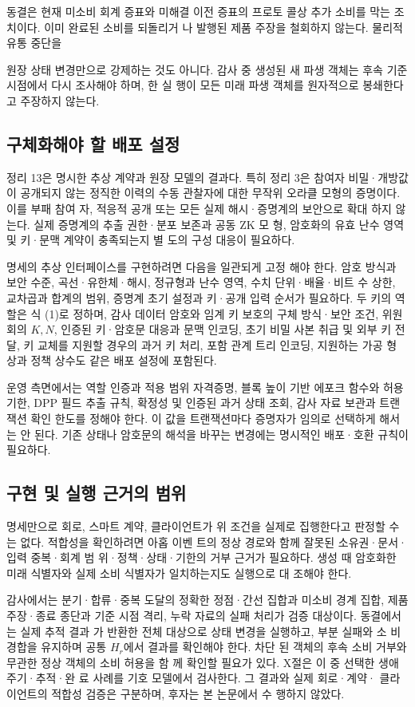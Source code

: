 동결은 현재 미소비 회계 증표와 미해결 이전 증표의 프로토
콜상 추가 소비를 막는 조치이다. 이미 완료된 소비를 되돌리거
나 발행된 제품 주장을 철회하지 않는다. 물리적 유통 중단을

원장 상태 변경만으로 강제하는 것도 아니다. 감사 중 생성된
새 파생 객체는 후속 기준 시점에서 다시 조사해야 하며, 한 실
행이 모든 미래 파생 객체를 원자적으로 봉쇄한다고 주장하지
않는다.

\subsection{구체화해야 할 배포 설정}
정리 13은 명시한 추상 계약과 원장 모델의 결과다. 특히 정리
3은 참여자 비밀·개방값이 공개되지 않는 정직한 이력의 수동
관찰자에 대한 무작위 오라클 모형의 증명이다. 이를 부패 참여
자, 적응적 공개 또는 모든 실제 해시·증명계의 보안으로 확대
하지 않는다. 실제 증명계의 추출 권한·분포 보존과 공동 ZK 모
형, 암호화의 유효 난수 영역 및 키·문맥 계약이 충족되는지 별
도의 구성 대응이 필요하다.

명세의 추상 인터페이스를 구현하려면 다음을 일관되게 고정
해야 한다. 암호 방식과 보안 수준, 곡선·유한체·해시, 정규형과
난수 영역, 수치 단위·배율·비트 수 상한, 교차곱과 합계의 범위,
증명계 초기 설정과 키·공개 입력 순서가 필요하다. 두 키의 역
할은 식 (1)로 정하며, 감사 데이터 암호와 임계 키 보호의 구체
방식·보안 조건, 위원회의 \(K,N\), 인증된 키·암호문 대응과 문맥
인코딩, 초기 비밀 사본 취급 및 외부 키 전달, 키 교체를 지원할
경우의 과거 키 처리, 포함 관계 트리 인코딩, 지원하는 가공 형
상과 정책 상수도 같은 배포 설정에 포함된다.

운영 측면에서는 역할 인증과 적용 범위 자격증명, 블록 높이
기반 에포크 함수와 허용 기한, DPP 필드 추출 규칙, 확정성 및
인증된 과거 상태 조회, 감사 자료 보관과 트랜잭션 확인 한도를
정해야 한다. 이 값을 트랜잭션마다 증명자가 임의로 선택하게
해서는 안 된다. 기존 상태나 암호문의 해석을 바꾸는 변경에는
명시적인 배포·호환 규칙이 필요하다.

\subsection{구현 및 실행 근거의 범위}
명세만으로 회로, 스마트 계약, 클라이언트가 위 조건을 실제로
집행한다고 판정할 수는 없다. 적합성을 확인하려면 아홉 이벤
트의 정상 경로와 함께 잘못된 소유권·문서·입력 중복·회계 범
위·정책·상태·기한의 거부 근거가 필요하다. 생성 때 암호화한
미래 식별자와 실제 소비 식별자가 일치하는지도 실행으로 대
조해야 한다.

감사에서는 분기·합류·중복 도달의 정확한 정점·간선 집합과
미소비 경계 집합, 제품 주장·종료 종단과 기준 시점 격리, 누락
자료의 실패 처리가 검증 대상이다. 동결에서는 실제 추적 결과
가 반환한 전체 대상으로 상태 변경을 실행하고, 부분 실패와 소
비 경합을 유지하며 공통 \(H_{r}\)에서 결과를 확인해야 한다. 차단
된 객체의 후속 소비 거부와 무관한 정상 객체의 소비 허용을 함
께 확인할 필요가 있다. X절은 이 중 선택한 생애주기·추적·완
료 사례를 기호 모델에서 검사한다. 그 결과와 실제 회로·계약·
클라이언트의 적합성 검증은 구분하며, 후자는 본 논문에서 수
행하지 않았다.
